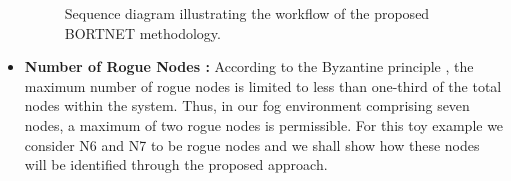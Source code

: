 \documentclass{sn-jnl}%
\begin{document}
\begin{itemize}
\begin{figure}[h!]
    \centering
\caption{Sequence diagram illustrating the workflow of the proposed BORTNET methodology.}
\end{figure}
\item \textbf{Number of Rogue Nodes :} According to the Byzantine principle \cite{castro1999practical}, the maximum number of rogue nodes is limited to less than one-third of the total nodes within the system. Thus, in our fog environment comprising seven nodes, a maximum of two rogue nodes is permissible. For this toy example we consider N6 and N7 to be rogue nodes and we shall show how these nodes will be identified through the proposed approach.


\end{itemize}
\end{document}
